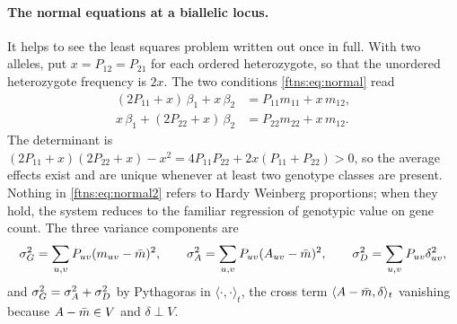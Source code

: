 \paragraph{The normal equations at a biallelic locus.} It helps to see the least squares problem
written out once in full. With two alleles, put $x=P_{12}=P_{21}$ for each ordered heterozygote,
so that the unordered heterozygote frequency is $2x$. The two conditions \eqref{ftns:eq:normal} read
\begin{equation}
\begin{aligned}
(2P_{11}+x)\,\beta_1+x\,\beta_2 &= P_{11}m_{11}+x\,m_{12},\\
x\,\beta_1+(2P_{22}+x)\,\beta_2 &= P_{22}m_{22}+x\,m_{12}.
\end{aligned}
\label{ftns:eq:normal2}
\end{equation}
The determinant is $(2P_{11}+x)(2P_{22}+x)-x^2=4P_{11}P_{22}+2x(P_{11}+P_{22})>0$, so the average
effects exist and are unique whenever at least two genotype classes are present. Nothing in
\eqref{ftns:eq:normal2} refers to Hardy Weinberg proportions; when they hold, the system reduces to
the familiar regression of genotypic value on gene count. The three variance components are
\[
\sigma^2_G=\sum_{u,v}P_{uv}(m_{uv}-\bar{m})^2,\qquad
\sigma^{2}_{A}=\sum_{u,v}P_{uv}(A_{uv}-\bar{m})^2,\qquad
\sigma^2_D=\sum_{u,v}P_{uv}\delta_{uv}^2,
\]
and $\sigma^2_G=\sigma^{2}_{A}+\sigma^2_D$ by Pythagoras in $\langle\cdot,\cdot\rangle_t$, the cross term
$\langle A-\bar{m},\delta\rangle_t$ vanishing because $A-\bar{m}\in V$ and $\delta\perp V$.

